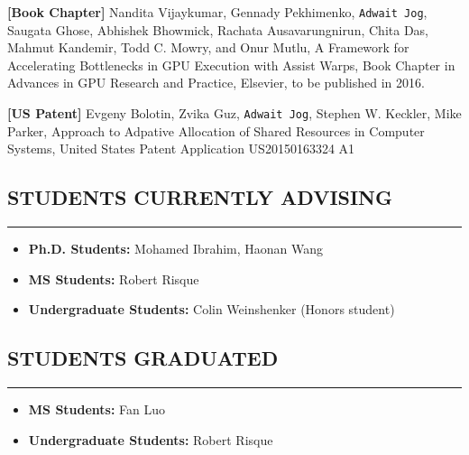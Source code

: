 \documentclass[10pt,a4]{article}
\begin{document}
\begin{description}

\item{\bf [Book Chapter]}
Nandita Vijaykumar, Gennady Pekhimenko, {\tt Adwait Jog}, Saugata Ghose, Abhishek Bhowmick, 
Rachata Ausavarungnirun, Chita Das, Mahmut Kandemir, Todd C. Mowry, and Onur Mutlu, 
A Framework for Accelerating Bottlenecks in GPU Execution with Assist Warps, 
Book Chapter in Advances in GPU Research and Practice, Elsevier, to be published in 2016. 

\item{\bf [US Patent]}
Evgeny Bolotin, Zvika Guz, {\tt Adwait Jog}, Stephen W. Keckler, Mike Parker, 
Approach to Adpative Allocation of Shared Resources in Computer Systems, 
United States Patent Application US20150163324 A1 

\end{description}

\subsection*{STUDENTS CURRENTLY ADVISING}
\hrule
\vspace{0.2cm}
\begin{itemize}
\item {\bf Ph.D. Students:} Mohamed Ibrahim, Haonan Wang
\item {\bf MS Students:}  Robert Risque 
\item {\bf Undergraduate Students:}  Colin Weinshenker (Honors student)
\end{itemize}

\subsection*{STUDENTS GRADUATED}
\hrule
\vspace{0.2cm}
\begin{itemize}
\item {\bf MS Students:}  Fan Luo 
\item {\bf Undergraduate Students:}  Robert Risque
\end{itemize}
\end{document}
